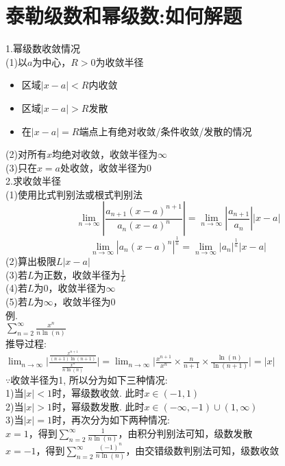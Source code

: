 \chapter{泰勒级数和幂级数:如何解题}
{\par\centering
{}
\par}

{\par\centering
{}
\par}

1.幂级数收敛情况\\
(1)以$a$为中心，$R>0$为收敛半径
\begin{itemize}
\item 区域$|x-a|<R$内收敛
\item 区域$|x-a|>R$发散
\item 在$|x-a|=R$端点上有绝对收敛/条件收敛/发散的情况
\end{itemize}
(2)对所有$x$均绝对收敛，收敛半径为$\infty$\\
(3)只在$x=a$处收敛，收敛半径为$0$\\[2ex]

2.求收敛半径\\
(1)使用比式判别法或根式判别法
\[\lim_{n\to\infty}|\frac{a_{n+1}(x-a)^{n+1}}{a_n(x-a)^n}|=\lim_{n\to\infty}|\frac{a_{n+1}}{a_n}||x-a|\]
\[\lim_{n\to\infty}|a_n(x-a)^n|^{\frac{1}{n}}=\lim_{n\to\infty}|a_n|^{\frac{1}{n}}|x-a|\]
(2)算出极限$L|x-a|$\\
(3)若$L$为正数，收敛半径为$\displaystyle\frac{1}{L}$\\
(4)若$L$为$0$，收敛半径为$\infty$\\
(5)若$L$为$\infty$，收敛半径为$0$\\
例.\\
$\displaystyle\sum_{n=2}^{\infty}\frac{x^n}{n\ln(n)}$\\
推导过程:\\[1ex]
$\displaystyle\lim_{n\to\infty}\bigg|\frac{\frac{x^{n+1}}{(n+1)\ln(n+1)}}{\frac{x^n}{n\ln(n)}}\bigg|=\lim_{n\to\infty}\Big|\frac{x^{n+1}}{x^n}\times\frac{n}{n+1}\times\frac{\ln(n)}{\ln(n+1)}\Big|=|x|$\\[1ex]
$\because$收敛半径为1, 所以分为如下三种情况:\\
1)当$|x|<1$时，幂级数收敛. 此时$x\in(-1,1)$\\
2)当$|x|>1$时，幂级数发散. 此时$x\in(-\infty,-1)\cup(1,\infty)$\\
3)当$|x|=1$时，再次分为如下两种情况:\\[1ex]
\phantom{\qquad}$x=1$，得到$\displaystyle\sum_{n=2}^{\infty}\frac{1}{n\ln(n)}$，由积分判别法可知，级数发散\\[1ex]
\phantom{\qquad}$x=-1$，得到$\displaystyle\sum_{n=2}^{\infty}\frac{(-1)^n}{n\ln(n)}$，由交错级数判别法可知，级数收敛\\[2ex]


